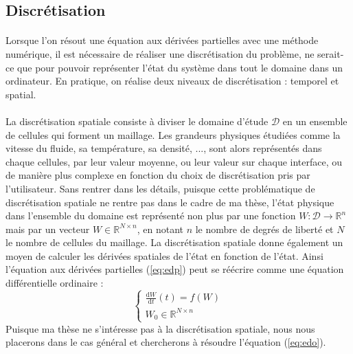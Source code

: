 	\subsection{Discrétisation}

		\paragraph{}
		Lorsque l'on résout une équation aux dérivées partielles avec une méthode numérique, il est nécessaire de réaliser une discrétisation du problème, ne serait-ce que pour pouvoir représenter l'état du système dans tout le domaine dans un ordinateur.
		En pratique, on réalise deux niveaux de discrétisation : temporel et spatial.

		\paragraph{}
		La discrétisation spatiale consiste à diviser le domaine d'étude $\mathcal{D}$ en un ensemble de cellules qui forment un maillage.
		Les grandeurs physiques étudiées comme la vitesse du fluide, sa température, sa densité, ..., sont alors représentés dans chaque cellules, par leur valeur moyenne, ou leur valeur sur chaque interface, ou de manière plus complexe en fonction du choix de discrétisation pris par l'utilisateur.
		Sans rentrer dans les détails, puisque cette problématique de discrétisation spatiale ne rentre pas dans le cadre de ma thèse, l'état physique dans l'ensemble du domaine est représenté non plus par une fonction $W : \mathcal{D} \rightarrow \mathbb{R}^n$ mais par un vecteur $W \in \mathbb{R}^{N\times n}$, en notant $n$ le nombre de degrés de liberté et $N$ le nombre de cellules du maillage.
		La discrétisation spatiale donne également un moyen de calculer les dérivées spatiales de l'état en fonction de l'état.
		Ainsi l'équation aux dérivées partielles (\ref{eq:edp}) peut se réécrire comme une équation différentielle ordinaire :
		\begin{equation}\label{eq:edo}
			\left\{\begin{aligned}
				\frac{\mathrm{d} W}{\mathrm{d} t}\left(t\right) = f\left(W\right) \\
				W_0 \in \mathbb{R}^{N\times n}
			\end{aligned}\right.
		\end{equation}
		Puisque ma thèse ne s'intéresse pas à la discrétisation spatiale, nous nous placerons dans le cas général et chercherons à résoudre l'équation (\ref{eq:edo}).


